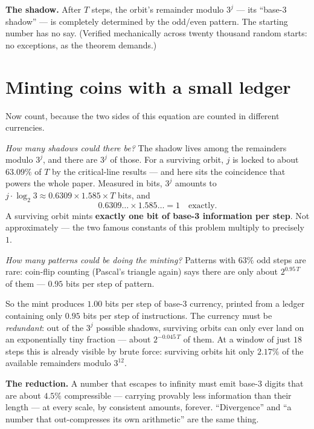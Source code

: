 \documentclass[11pt]{article}
\begin{document}
\begin{keyidea}
\textbf{The shadow.} After $T$ steps, the orbit's remainder modulo
$3^j$ --- its ``base-3 shadow'' --- is completely determined by the
odd/even pattern. The starting number has no say. (Verified
mechanically across twenty thousand random starts: no exceptions, as
the theorem demands.)
\end{keyidea}

\section{Minting coins with a small ledger}

Now count, because the two sides of this equation are counted in
different currencies.

\emph{How many shadows could there be?} The shadow lives among the
remainders modulo $3^j$, and there are $3^j$ of those. For a
surviving orbit, $j$ is locked to about $63.09\%$ of $T$ by the
critical-line results --- and here sits the coincidence that powers
the whole paper. Measured in bits, $3^j$ amounts to
$j \cdot \log_2 3 \approx 0.6309 \times 1.585 \times T$ bits, and
\[
0.6309\ldots \times 1.585\ldots = 1 \quad \text{exactly.}
\]
A surviving orbit mints \textbf{exactly one bit of base-3 information
per step}. Not approximately --- the two famous constants of this
problem multiply to precisely $1$.

\emph{How many patterns could be doing the minting?} Patterns with
$63\%$ odd steps are rare: coin-flip counting (Pascal's triangle
again) says there are only about $2^{0.95\,T}$ of them ---
$0.95$ bits per step of pattern.

So the mint produces $1.00$ bits per step of base-3 currency, printed
from a ledger containing only $0.95$ bits per step of instructions.
The currency must be \emph{redundant}: out of the $3^j$ possible
shadows, surviving orbits can only ever land on an exponentially tiny
fraction --- about $2^{-0.045\,T}$ of them. At a window of just $18$
steps this is already visible by brute force: surviving orbits hit
only $2.17\%$ of the available remainders modulo $3^{12}$.

\begin{keyidea}
\textbf{The reduction.} A number that escapes to infinity must emit
base-3 digits that are about $4.5\%$ compressible --- carrying
provably less information than their length --- at every scale, by
consistent amounts, forever. ``Divergence'' and ``a number that
out-compresses its own arithmetic'' are the same thing.
\end{keyidea}
\end{document}
